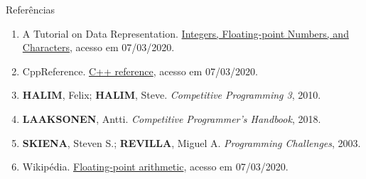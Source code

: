 \begin{frame}[fragile]{Referências}

    \begin{enumerate}
        \item A Tutorial on Data Representation. \href{http://www.ntu.edu.sg/home/ehchua/programming/java/datarepresentation.html}{Integers, Floating-point Numbers, and Characters}, acesso em 07/03/2020.

        \item CppReference. \href{https://en.cppreference.com/w/}{C++ reference}, acesso em 07/03/2020.

        \item \textbf{HALIM}, Felix; \textbf{HALIM}, Steve. \textit{Competitive Programming 3}, 2010.
        \item \textbf{LAAKSONEN}, Antti. \textit{Competitive Programmer's Handbook}, 2018.

        \item \textbf{SKIENA}, Steven S.; \textbf{REVILLA}, Miguel A. \textit{Programming
            Challenges}, 2003.

        \item Wikipédia. \href{https://en.wikipedia.org/wiki/Floating-point\_arithmetic}{Floating-point arithmetic}, acesso em 07/03/2020.

    \end{enumerate}

\end{frame}
